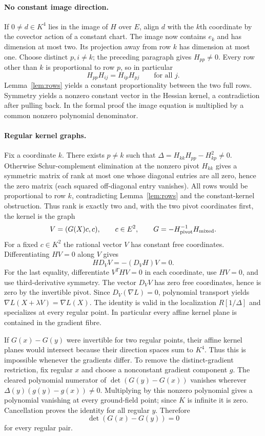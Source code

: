 \documentclass[11pt,a4paper]{article}
\begin{document}
\paragraph{No constant image direction.}
If $0\ne d\in K^4$ lies in the image of $H$ over $E$, align $d$ with the $k$th coordinate by the covector action of a constant chart. The image now contains $e_k$ and has dimension at most two. Its projection away from row $k$ has dimension at most one. Choose distinct $p,i\ne k$; the preceding paragraph gives $H_{pp}\ne0$. Every row other than $k$ is proportional to row $p$, so in particular
\[
 H_{pp}H_{ij}=H_{ip}H_{pj}\qquad\text{for all }j.
\]
Lemma~\ref{lem:rows} yields a constant proportionality between the two full rows. Symmetry yields a nonzero constant vector in the Hessian kernel, a contradiction after pulling back. In the formal proof the image equation is multiplied by a common nonzero polynomial denominator.

\paragraph{Regular kernel graphs.}
Fix a coordinate $k$. There exists $p\ne k$ such that $\Delta=H_{kk}H_{pp}-H_{kp}^2\ne0$. Otherwise Schur-complement elimination at the nonzero pivot $H_{kk}$ gives a symmetric matrix of rank at most one whose diagonal entries are all zero, hence the zero matrix (each squared off-diagonal entry vanishes). All rows would be proportional to row $k$, contradicting Lemma~\ref{lem:rows} and the constant-kernel obstruction. Thus rank is exactly two and, with the two pivot coordinates first, the kernel is the graph
\[
 V=(G(X)c,c),\qquad c\in E^2,\qquad
 G=-H_{\rm pivot}^{-1}H_{\rm mixed}.
\]
For a fixed $c\in K^2$ the rational vector $V$ has constant free coordinates. Differentiating $HV=0$ along $V$ gives
\[
 H D_VV=-(D_V H)V=0.
\]
For the last equality, differentiate $V^THV=0$ in each coordinate, use $HV=0$, and use third-derivative symmetry. The vector $D_VV$ has zero free coordinates, hence is zero by the invertible pivot. Since $D_V(\nabla L)=0$, polynomial transport yields $\nabla L(X+\lambda V)=\nabla L(X)$. The identity is valid in the localization $R[1/\Delta]$ and specializes at every regular point. In particular every affine kernel plane is contained in the gradient fibre.

If $G(x)-G(y)$ were invertible for two regular points, their affine kernel planes would intersect because their direction spaces sum to $K^4$. Thus this is impossible whenever the gradients differ. To remove the distinct-gradient restriction, fix regular $x$ and choose a nonconstant gradient component $g$. The cleared polynomial numerator of $\det(G(y)-G(x))$ vanishes wherever $\Delta(y)(g(y)-g(x))\ne0$. Multiplying by this nonzero polynomial gives a polynomial vanishing at every ground-field point; since $K$ is infinite it is zero. Cancellation proves the identity for all regular $y$. Therefore
\[
 \det(G(x)-G(y))=0
\]
for every regular pair.
\end{document}
